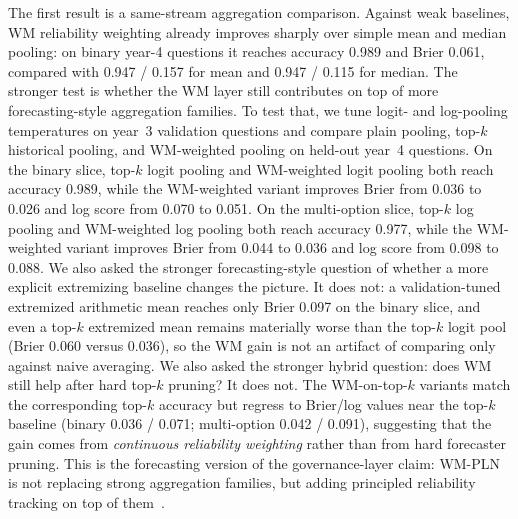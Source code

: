 \documentclass[11pt,openany]{report}
\begin{document}
The first result is a same-stream aggregation comparison.  Against weak
baselines, WM reliability weighting already improves sharply over simple
mean and median pooling: on binary year-4 questions it reaches accuracy
0.989 and Brier 0.061, compared with 0.947 / 0.157 for mean and
0.947 / 0.115 for median.  The stronger test is whether the WM layer
still contributes on top of more forecasting-style aggregation families.
To test that, we tune logit- and log-pooling temperatures on year~3
validation questions and compare plain pooling, top-$k$ historical
pooling, and WM-weighted pooling on held-out year~4 questions.  On the
binary slice, top-$k$ logit pooling and WM-weighted logit pooling both
reach accuracy 0.989, while the WM-weighted variant improves Brier from
0.036 to 0.026 and log score from 0.070 to 0.051.  On the multi-option
slice, top-$k$ log pooling and WM-weighted log pooling both reach
accuracy 0.977, while the WM-weighted variant improves Brier from 0.044
to 0.036 and log score from 0.098 to 0.088.  We also asked the stronger
forecasting-style question of whether a more explicit extremizing
baseline changes the picture.  It does not: a validation-tuned
extremized arithmetic mean reaches only Brier 0.097 on the binary slice,
and even a top-$k$ extremized mean remains materially worse than the
top-$k$ logit pool (Brier 0.060 versus 0.036), so the WM gain is not an
artifact of comparing only against naive averaging.
We also asked the stronger
hybrid question: does WM still help after hard top-$k$ pruning?  It
does not.  The WM-on-top-$k$ variants match the corresponding top-$k$
accuracy but regress to Brier/log values near the top-$k$ baseline
(binary 0.036 / 0.071; multi-option 0.042 / 0.091), suggesting that the
gain comes from \emph{continuous reliability weighting} rather than from
hard forecaster pruning.  This is the forecasting version of the
governance-layer claim: WM-PLN is not replacing strong aggregation
families, but adding principled reliability tracking on top of
them~\cite{Satopaa2014LogitAggregation,Baron2014Extremizing}.
\end{document}
